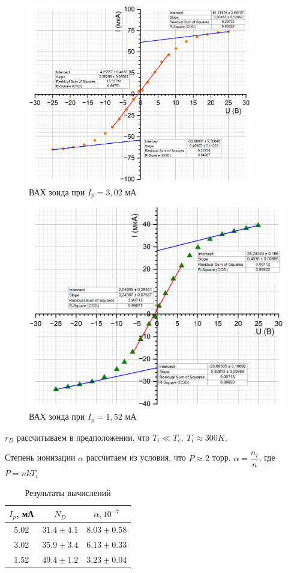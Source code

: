 \documentclass[a4paper, 12pt]{article}
\begin{document}
	\begin{figure}
		\centering
		\includegraphics[width = 0.87\textwidth, height = 0.45\textheight]{3mA}
		\caption{ВАХ зонда при $I_p = 3,02$ мА}
	\end{figure}
	
	\begin{figure}[h!]
		\centering
		\includegraphics[width = \textwidth]{1,5mA}
		\caption{ВАХ зонда при $I_p = 1,52$ мА}
	\end{figure}
	\newpage
	$r_D$ рассчитываем в предположении, что $T_i \ll T_e, \ T_i \approx 300 K$.
	
	Степень ионизации $\alpha$ рассчитаем из условия, что $P \approx 2$ торр. $\alpha = \dfrac{n_i}{n}$, где $P = nkT_i$
	\begin{table}[h!]
		\centering
		\begin{tabular}{|c|c|c|}
			\hline
			$I_p$, мА & $N_D$ & $\alpha, 10^{-7}$ \\ \hline
			5.02 & $31.4 \pm 4.1 $ & $8.03 \pm 0.58$ \\ \hline
			3.02 & $35.9 \pm 3.4$ & $6.13 \pm 0.33$ \\ \hline
			1.52 & $49.4 \pm 1.2$ & $3.23 \pm 0.04$ \\ \hline
		\end{tabular}
		\caption{Результаты вычислений}
	\end{table}
	
\end{document}

